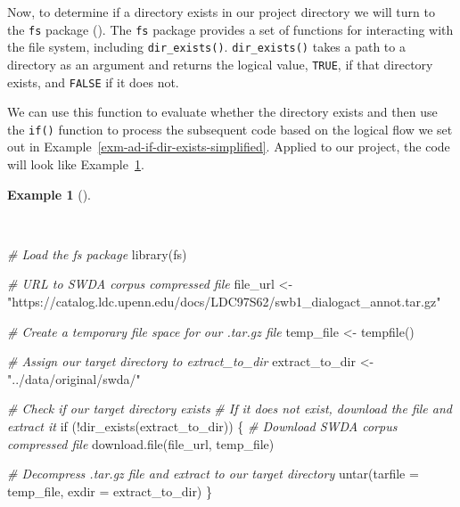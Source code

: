 \documentclass[
  letterpaper,
]{latex/krantz}
\newenvironment{Shaded}{\begin{snugshade}}{\end{snugshade}}
\newcommand{\AttributeTok}[1]{\textcolor[rgb]{0.00,0.00,0.00}{#1}}
\newcommand{\CommentTok}[1]{\textcolor[rgb]{0.00,0.00,0.00}{\textit{#1}}}
\newcommand{\ControlFlowTok}[1]{\textcolor[rgb]{0.00,0.00,0.00}{#1}}
\newcommand{\FunctionTok}[1]{\textcolor[rgb]{0.00,0.00,0.00}{#1}}
\newcommand{\NormalTok}[1]{\textcolor[rgb]{0.00,0.00,0.00}{#1}}
\newcommand{\OtherTok}[1]{\textcolor[rgb]{0.00,0.00,0.00}{#1}}
\newcommand{\SpecialCharTok}[1]{\textcolor[rgb]{0.00,0.00,0.00}{#1}}
\newcommand{\StringTok}[1]{\textcolor[rgb]{0.00,0.00,0.00}{#1}}
\theoremstyle{definition}
\newtheorem{example}{Example}[chapter]
\theoremstyle{remark}
\begin{document}
Now, to determine if a directory exists in our project directory we will
turn to the \texttt{fs} package (). The \texttt{fs} package provides a set of functions
for interacting with the file system, including \texttt{dir\_exists()}.
\texttt{dir\_exists()} takes a path to a directory as an argument and
returns the logical value, \texttt{TRUE}, if that directory exists, and
\texttt{FALSE} if it does not.

We can use this function to evaluate whether the directory exists and
then use the \texttt{if()} function to process the subsequent code based
on the logical flow we set out in
Example~\ref{exm-ad-if-dir-exists-simplified}. Applied to our project,
the code will look like Example~\ref{exm-ad-swda-if-dir-exists}.

\begin{example}[]\protect\hypertarget{exm-ad-swda-if-dir-exists}{}\label{exm-ad-swda-if-dir-exists}

~

\begin{Shaded}
\begin{Highlighting}[]
\CommentTok{\# Load the \textasciigrave{}fs\textasciigrave{} package}
\FunctionTok{library}\NormalTok{(fs)}

\CommentTok{\# URL to SWDA corpus compressed file}
\NormalTok{file\_url }\OtherTok{\textless{}{-}}
  \StringTok{"https://catalog.ldc.upenn.edu/docs/LDC97S62/swb1\_dialogact\_annot.tar.gz"}

\CommentTok{\# Create a temporary file space for our .tar.gz file}
\NormalTok{temp\_file }\OtherTok{\textless{}{-}} \FunctionTok{tempfile}\NormalTok{()}

\CommentTok{\# Assign our target directory to \textasciigrave{}extract\_to\_dir\textasciigrave{}}
\NormalTok{extract\_to\_dir }\OtherTok{\textless{}{-}} \StringTok{"../data/original/swda/"}

\CommentTok{\# Check if our target directory exists}
\CommentTok{\# If it does not exist, download the file and extract it}
\ControlFlowTok{if}\NormalTok{ (}\SpecialCharTok{!}\FunctionTok{dir\_exists}\NormalTok{(extract\_to\_dir)) \{}
  \CommentTok{\# Download SWDA corpus compressed file}
  \FunctionTok{download.file}\NormalTok{(file\_url, temp\_file)}

  \CommentTok{\# Decompress .tar.gz file and extract to our target directory}
  \FunctionTok{untar}\NormalTok{(}\AttributeTok{tarfile =}\NormalTok{ temp\_file, }\AttributeTok{exdir =}\NormalTok{ extract\_to\_dir)}
\NormalTok{\}}
\end{Highlighting}
\end{Shaded}

\end{example}
\end{document}
